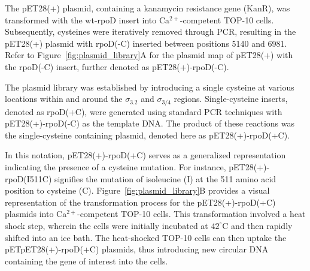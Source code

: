 The pET28(+) plasmid, containing a kanamycin resistance gene (KanR), was transformed with the \ac{wt-rpoD} insert into Ca$^{2+}$-competent TOP-10 cells.
Subsequently, cysteines were iteratively removed through \ac{PCR}, resulting in the pET28(+) plasmid with rpoD(-C) inserted between positions 5140 and 6981. 
Refer to Figure~\ref{fig:plasmid_library}A for the plasmid map of pET28(+) with the rpoD(-C) insert, further denoted as pET28(+)-rpoD(-C).

The plasmid library was established by introducing a single cysteine at various locations within and around the $\sigma_{3.2}$ and $\sigma_{3/4}$ regions. 
Single-cysteine inserts, denoted as rpoD(+C), were generated using standard \ac{PCR} techniques with pET28(+)-rpoD(-C) as the template DNA.
The product of these reactions was the single-cysteine containing plasmid, denoted here as pET28(+)-rpoD(+C).

In this notation, pET28(+)-rpoD(+C) serves as a generalized representation indicating the presence of a cysteine mutation. 
For instance, pET28(+)-rpoD(I511C) signifies the mutation of isoleucine (I) at the 511 amino acid position to cysteine (C). 
Figure~\ref{fig:plasmid_library}B provides a visual representation of the transformation process for the pET28(+)-rpoD(+C) plasmids into Ca$^{2+}$-competent TOP-10 cells. 
This transformation involved a heat shock step, wherein the cells were initially incubated at $42^{\circ}$C and then rapidly shifted into an ice bath.
The heat-shocked TOP-10 cells can then uptake the pETpET28(+)-rpoD(+C) plasmids, thus introducing new circular DNA containing the gene of interest into the cells. 

